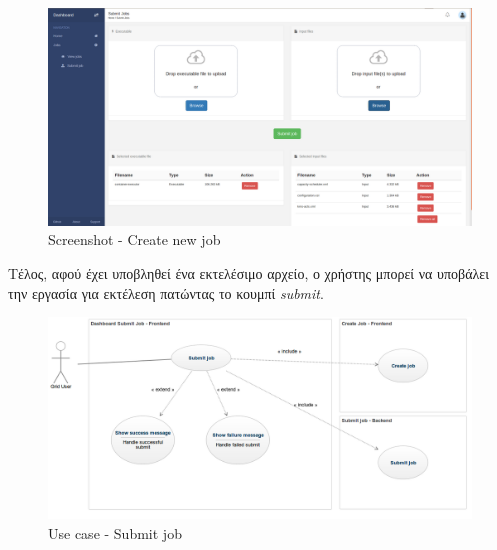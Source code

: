 \begin{figure}[bp!]
\caption{Screenshot - Create new job}
\includegraphics[width=16cm]{../images/submit-job-screenshot.png}
\centering
\end{figure}
\clearpage


Τέλος, αφού έχει υποβληθεί ένα εκτελέσιμο αρχείο, ο χρήστης μπορεί να υποβάλει την εργασία για εκτέλεση πατώντας το κουμπί \textit{submit}.

\begin{figure}[t]
\caption{Use case - Submit job}
\includegraphics[width=16cm]{../images/submit-job-case.png}
\centering
\end{figure}
\clearpage




